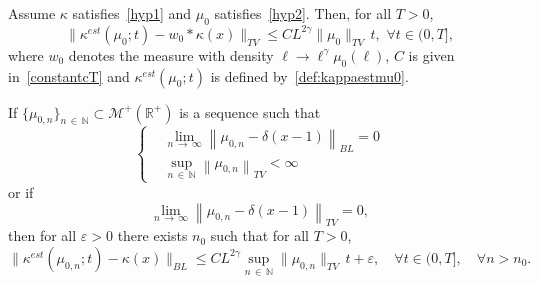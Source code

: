 \documentclass[10pt]{amsart}
\theoremstyle{definition}\newtheorem{defi}[theo]{Definition}\newtheorem{rema}[theo]{Remark}\newtheorem{exam}[theo]{Example}\newtheorem{exem}[theo]{Example}\newtheorem{nota}[theo]{Notation}
\newcommand*\R{\mathbb{R}}
\newcommand*\M{\mathcal{M}}
\newcommand*\N{\mathbb{N}}
\let\oldforall\forall
\renewcommand*{\forall}{\mathrel{\oldforall}}
\begin{document}
\begin{coro}\label{cor:generic}
Assume $\kappa$ satisfies~\eqref{hyp1} and $\mu_0$
satisfies~\eqref{hyp2}.
 Then, for all $T>0$,
\begin{equation}\label{cor:generic1}
\Big\|{\kappa^{est}(\mu _0; t)}-w_0\ast\kappa(x)\Big\|_{TV} \leq CL^{2\gamma }\|\mu_0\|_{TV}\, t,\,\,\forall t\in (0, T],
\end{equation}
where $w_0$ denotes the measure with density $\ell \to \ell^{\gamma}\mu _0(\ell)$, $C$ is given in~\eqref{constantcT} and $\kappa^{est}(\mu_0;t)$ is defined by~\eqref{def:kappaestmu0}.

If $\{\mu _{ 0, n }\}_{n\,\in\,\N}\subset \M^+(\R^+)$ is a sequence such that
\begin{equation}\label{mcd1}
\begin{cases}
&\lim_{n\,\to\,\infty}\left\|\mu _{0, n}-\delta (x-1)\right\|_{BL}=0\\
&\sup_{n\,\in\,\N}\left\|\mu _{0, n}\right\|_{TV}<\infty
\end{cases}
\end{equation}
or if
\begin{equation}\label{mcd2}
\lim _{n\,\to\,\infty}\left\|\mu _{0, n}-\delta (x-1)\right\|_{TV}=0,
\end{equation}
then for all $\varepsilon >0$ there exists $n_0$ such that for all $T>0$,
\begin{equation}\label{cor:generic2}
\Big\|{\kappa^{est}(\mu _{ 0, n }; t)}- \kappa(x)\Big\|_{BL} \leq CL^{2\gamma}
\sup_{n\,\in\,\N}\|\mu _{0, n}\|_{TV}\,t+\varepsilon,\quad\forall t\in (0, T],\quad \forall n>n_0.
\end{equation}

\end{coro}
\end{document}
